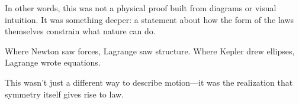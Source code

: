 In other words, this was not a physical proof built from diagrams or visual intuition. It was something deeper: a statement about how the form of the laws themselves constrain what nature can do.

Where Newton saw forces, Lagrange saw structure. Where Kepler drew ellipses, Lagrange wrote equations.

This wasn’t just a different way to describe motion—it was the realization that symmetry itself gives rise to law.




